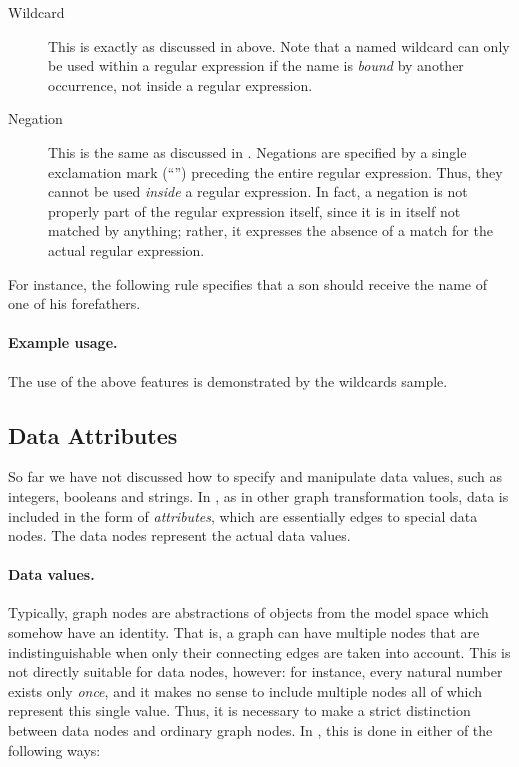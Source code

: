 \begin{description}
\item[Wildcard] This is exactly as discussed in  above.  Note
  that a named wildcard can only be used within a regular expression if the
  name is \emph{bound} by another occurrence, not inside a regular expression.

\item[Negation] This is the same as discussed in . Negations
  are specified by a single exclamation mark (``\lab{!}'') preceding the
  entire regular expression. Thus, they cannot be used \emph{inside} a
  regular expression. In fact, a negation is not properly part of the regular
  expression itself, since it is in itself not matched by anything; rather, it
  expresses the absence of a match for the actual regular expression.
\end{description}

For instance, the following rule specifies that a son should receive the name
of one of his forefathers.


\paragraph{Example usage.}

The use of the above features is demonstrated by the \GROOVE \textsf{wildcards}
sample.

\subsection{Data Attributes}

So far we have not discussed how to specify and manipulate data values, such as
integers, booleans and strings. In \GROOVE, as in other graph transformation
tools, data is included in the form of \emph{attributes}, which are essentially
edges to special data nodes. The data nodes represent the actual data values.

\paragraph{Data values.}

Typically, graph nodes are abstractions of objects from the model space which
somehow have an identity. That is, a graph can have multiple nodes that are
indistinguishable when only their connecting edges are taken into account. This
is not directly suitable for data nodes, however: for instance, every natural
number exists only \emph{once}, and it makes no sense to include multiple nodes
all of which represent this single value. Thus, it is necessary to make a
strict distinction between data nodes and ordinary graph nodes. In \GROOVE,
this is done in either of the following ways:

